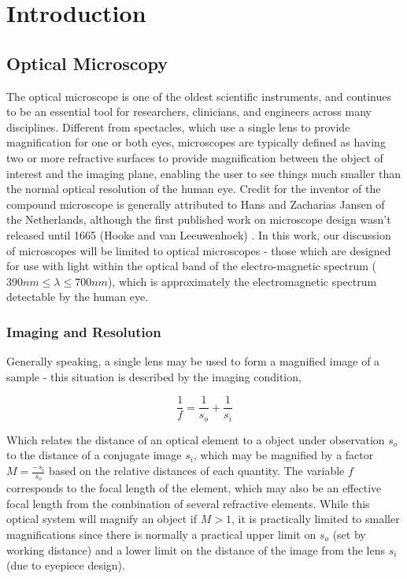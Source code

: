 \chapter{Introduction}\label{ch:introduction}

\section{Optical Microscopy}

The optical microscope is one of the oldest scientific instruments, and continues to be an essential tool for researchers, clinicians, and engineers across many disciplines. Different from spectacles, which use a single lens to provide magnification for one or both eyes, microscopes are typically defined as having two or more refractive surfaces to provide magnification between the object of interest and the imaging plane, enabling the user to see things much smaller than the normal optical resolution of the human eye. Credit for the inventor of the compound microscope is generally attributed to Hans and Zacharias Jansen of the Netherlands, although the first published work on microscope design wasn't released until 1665 (Hooke and van Leeuwenhoek) \cite{natureMilestones,hookeMicrographica}. In this work, our discussion of microscopes will be limited to optical microscopes - those which are designed for use with light within the optical band of the electro-magnetic spectrum ($390nm \leq \lambda \leq 700nm$), which is approximately the electromagnetic spectrum detectable by the human eye.

\subsection{Imaging and Resolution}
Generally speaking, a single lens may be used to form a magnified image of a sample - this situation is described by the imaging condition,

\begin{equation}
\frac{1}{f} = \frac{1}{s_o} + \frac{1}{s_i}
\end{equation}

Which relates the distance of an optical element to a object under observation $s_o$ to the distance of a conjugate image $s_i$, which may be magnified by a factor $M = \frac{-s_i}{s_o}$ based on the relative distances of each quantity. The variable $f$ corresponds to the focal length of the element, which may also be an effective focal length from the combination of several refractive elements. While this optical system will magnify an object if $M > 1$, it is practically limited to smaller magnifications since there is normally a practical upper limit on $s_o$ (set by working distance) and a lower limit on the distance of the image from the lens $s_i$ (due to eyepiece design).

